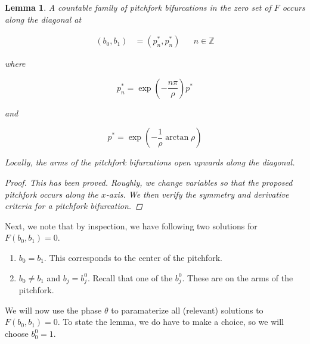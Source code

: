 \documentclass[12pt]{article}
\def\Z{{\mathbb Z}}
\newtheorem{lemma}{Lemma}
\begin{document}
\begin{lemma}\label{pitchforkF}
A countable family of pitchfork bifurcations in the zero set of $F$ occurs along the diagonal at 

\begin{align*}
(b_0, b_1) &= (p_n^*, p_n^*) && n \in \Z
\end{align*}

where 

\begin{equation}
p^*_n = \exp\left(-\frac{n \pi}{\rho} \right) p^*
\end{equation}

and 

\begin{equation}
p^* = \exp \left( -\frac{1}{\rho} \arctan \rho \right)
\end{equation}

Locally, the arms of the pitchfork bifurcations open upwards along the diagonal.
\begin{proof}
This has been proved. Roughly, we change variables so that the proposed pitchfork occurs along the $x$-axis. We then verify the symmetry and derivative criteria for a pitchfork bifurcation.
\end{proof}
\end{lemma}

Next, we note that by inspection, we have following two solutions for $F(b_0,b_1) = 0$. 
\begin{enumerate}
	\item $b_0 = b_1$. This corresponds to the center of the pitchfork.
	\item $b_0 \neq b_1$ and $b_j = b_j^0$. Recall that one of the $b_j^0$. These are on the arms of the pitchfork.
\end{enumerate}

We will now use the phase $\theta$ to paramaterize all (relevant) solutions to $F(b_0, b_1) = 0$. To state the lemma, we do have to make a choice, so we will choose $b_0^0 = 1$. 
\end{document}
